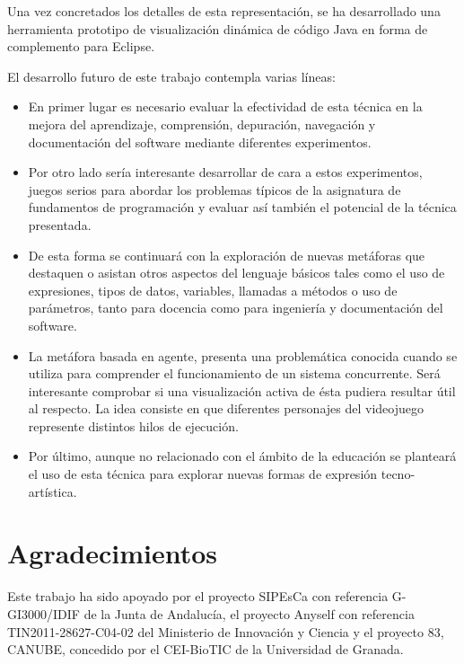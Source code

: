 \documentclass{llncs}
\begin{document}
Una vez concretados los detalles de esta representación, se ha desarrollado una herramienta prototipo de visualización dinámica de código Java en forma de complemento para Eclipse. 

El desarrollo futuro de este trabajo contempla varias líneas:
\begin{itemize}
\item En primer lugar es necesario evaluar la efectividad de esta técnica en la mejora del aprendizaje, comprensión, depuración, navegación y documentación del software mediante diferentes experimentos.
\item Por otro lado sería interesante desarrollar de cara a estos experimentos, juegos serios para abordar los problemas típicos de la asignatura de fundamentos de programación y evaluar así también el potencial de la técnica presentada.
\item De esta forma se continuará con la exploración de nuevas metáforas que destaquen o asistan otros aspectos del lenguaje básicos tales como el uso de expresiones, tipos de datos, variables, llamadas a métodos o uso de parámetros, tanto para docencia como para ingeniería y documentación del software.

\item La metáfora basada en agente, presenta una problemática conocida cuando se utiliza para comprender el funcionamiento de un sistema concurrente. Será interesante comprobar si una visualización activa de ésta pudiera resultar útil al respecto. La idea consiste en que diferentes personajes del videojuego represente distintos hilos de ejecución.
 



\item Por último, aunque no relacionado con el ámbito de la educación se planteará el uso de esta técnica para explorar nuevas formas de expresión tecno-artística.
\end{itemize}





\section*{Agradecimientos}
Este trabajo ha sido apoyado por el proyecto SIPEsCa con
referencia G-GI3000/IDIF de la Junta de Andalucía, el proyecto Anyself
con referencia TIN2011-28627-C04-02 del Ministerio de Innovación y
Ciencia y el proyecto 83, CANUBE, concedido por el CEI-BioTIC de la
Universidad de Granada. 





\end{document}
